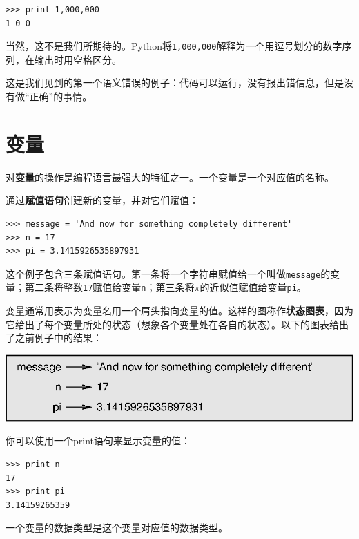 \beforeverb
\begin{verbatim}
>>> print 1,000,000
1 0 0
\end{verbatim}
\afterverb
%
当然，这不是我们所期待的。Python将{\tt 1,000,000}解释为一个用逗号划分的数字序列，在输出时用空格区分。


这是我们见到的第一个语义错误的例子：代码可以运行，没有报出错信息，但是没有做“正确”的事情。

\section{变量}

对{\bf 变量}的操作是编程语言最强大的特征之一。一个变量是一个对应值的名称。

通过{\bf 赋值语句}创建新的变量，并对它们赋值：

\beforeverb
\begin{verbatim}
>>> message = 'And now for something completely different'
>>> n = 17
>>> pi = 3.1415926535897931
\end{verbatim}
\afterverb
%
这个例子包含三条赋值语句。第一条将一个字符串赋值给一个叫做{\tt message}的变量；第二条将整数{\tt 17}赋值给变量{\tt n}；第三条将$\pi$的近似值赋值给变量{\tt pi}。


变量通常用表示为变量名用一个肩头指向变量的值。这样的图称作{\bf 状态图表}，因为它给出了每个变量所处的状态（想象各个变量处在各自的状态）。以下的图表给出了之前例子中的结果：

\beforefig
\centerline{\includegraphics{figs/state2.eps}}
\afterfig

你可以使用一个print语句来显示变量的值：

\beforeverb
\begin{verbatim}
>>> print n
17
>>> print pi
3.14159265359
\end{verbatim}
\afterverb
%
一个变量的数据类型是这个变量对应值的数据类型。


